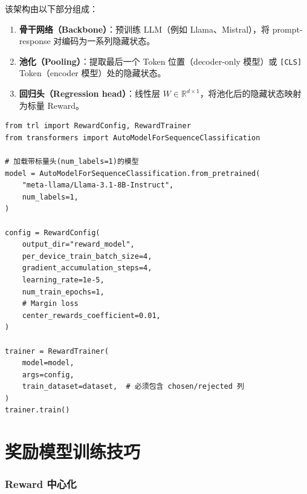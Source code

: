 该架构由以下部分组成：

\begin{enumerate}
  \item \textbf{骨干网络（Backbone）}：预训练 LLM（例如 Llama、Mistral），将 prompt-response 对编码为一系列隐藏状态。
  \item \textbf{池化（Pooling）}：提取最后一个 Token 位置（decoder-only 模型）或 \texttt{[CLS]} Token（encoder 模型）处的隐藏状态。
  \item \textbf{回归头（Regression head）}：线性层 $W \in \mathbb{R}^{d \times 1}$，将池化后的隐藏状态映射为标量 Reward。
\end{enumerate}

\begin{examplebox}
\begin{lstlisting}[style=pythonstyle]
from trl import RewardConfig, RewardTrainer
from transformers import AutoModelForSequenceClassification

# 加载带标量头(num_labels=1)的模型
model = AutoModelForSequenceClassification.from_pretrained(
    "meta-llama/Llama-3.1-8B-Instruct",
    num_labels=1,
)

config = RewardConfig(
    output_dir="reward_model",
    per_device_train_batch_size=4,
    gradient_accumulation_steps=4,
    learning_rate=1e-5,
    num_train_epochs=1,
    # Margin loss
    center_rewards_coefficient=0.01,
)

trainer = RewardTrainer(
    model=model,
    args=config,
    train_dataset=dataset,  # 必须包含 chosen/rejected 列
)
trainer.train()
\end{lstlisting}
\end{examplebox}

\section{奖励模型训练技巧}
\label{sec:rm-tricks}

\subsubsection*{Reward 中心化}
\label{reward-centering}

